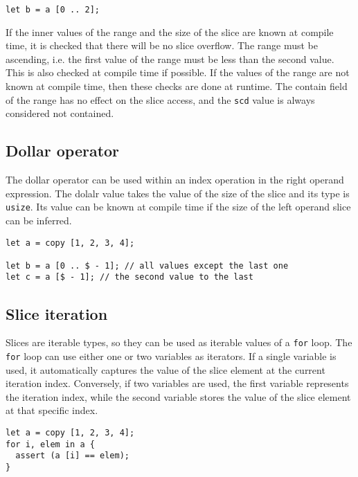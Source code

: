 \begin{itemize}
\begin{lstlisting}[style=coloredverbatim]
let b = a [0 .. 2];
  \end{lstlisting}

  If the inner values of the range and the size of the slice are known at
  compile time, it is checked that there will be no slice overflow. The range
  must be ascending, i.e. the first value of the range must be less than the
  second value. This is also checked at compile time if possible. If the values
  of the range are not known at compile time, then these checks are done at
  runtime. The contain field of the range has no effect on the slice access, and
  the \texttt{scd} value is always considered not contained.

\end{itemize}


\subsection{Dollar operator}

The dollar operator can be used within an index operation in the right operand
expression. The dolalr value takes the value of the size of the slice and its
type is \texttt{usize}. Its value can be known at compile time if the size of
the left operand slice can be inferred.

\begin{lstlisting}[style=coloredverbatim]
let a = copy [1, 2, 3, 4];

let b = a [0 .. $ - 1]; // all values except the last one
let c = a [$ - 1]; // the second value to the last
\end{lstlisting}


\subsection{Slice iteration}

Slices are iterable types, so they can be used as iterable values of a
\texttt{for} loop. The \texttt{for} loop can use either one or two variables as
iterators. If a single variable is used, it automatically captures the value of
the slice element at the current iteration index. Conversely, if two variables
are used, the first variable represents the iteration index, while the second
variable stores the value of the slice element at that specific index.

\begin{lstlisting}[style=coloredverbatim]
let a = copy [1, 2, 3, 4];
for i, elem in a {
  assert (a [i] == elem);
}
\end{lstlisting}

